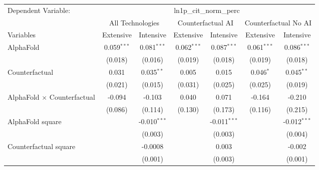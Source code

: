 \begingroup
\centering
\begin{tabular}{lcccccc}
   \tabularnewline \midrule \midrule
   Dependent Variable: & \multicolumn{6}{c}{ln1p\_cit\_norm\_perc}\\
 & \multicolumn{2}{c}{All Technologies} & \multicolumn{2}{c}{Counterfactual AI} & \multicolumn{2}{c}{Counterfactual No AI} \\
\cmidrule(lr){1-1}\cmidrule(lr){2-3} \cmidrule(lr){4-5} \cmidrule(lr){6-7}
Variables & \multicolumn{1}{c}{Extensive} & \multicolumn{1}{c}{Intensive} & \multicolumn{1}{c}{Extensive} & \multicolumn{1}{c}{Intensive} & \multicolumn{1}{c}{Extensive} & \multicolumn{1}{c}{Intensive} \\
\cmidrule(lr){1-1}\cmidrule(lr){2-2} \cmidrule(lr){3-3} \cmidrule(lr){4-4} \cmidrule(lr){5-5} \cmidrule(lr){6-6} \cmidrule(lr){7-7}
   AlphaFold                          & 0.059$^{***}$ & 0.081$^{***}$  & 0.062$^{***}$ & 0.087$^{***}$  & 0.061$^{***}$ & 0.086$^{***}$\\   
                                      & (0.018)       & (0.016)        & (0.019)       & (0.018)        & (0.019)       & (0.018)\\   
   Counterfactual                     & 0.031         & 0.035$^{**}$   & 0.005         & 0.015          & 0.046$^{*}$   & 0.045$^{**}$\\   
                                      & (0.021)       & (0.015)        & (0.031)       & (0.025)        & (0.025)       & (0.019)\\   
   AlphaFold $\times$ Counterfactual  & -0.094        & -0.103         & 0.040         & 0.071          & -0.164        & -0.210\\   
                                      & (0.086)       & (0.114)        & (0.130)       & (0.173)        & (0.116)       & (0.215)\\   
   AlphaFold square                   &               & -0.010$^{***}$ &               & -0.011$^{***}$ &               & -0.012$^{***}$\\   
                                      &               & (0.003)        &               & (0.003)        &               & (0.004)\\   
   Counterfactual square              &               & -0.0008        &               & 0.003          &               & -0.002\\   
                                      &               & (0.001)        &               & (0.003)        &               & (0.001)\\   

\end{tabular}
